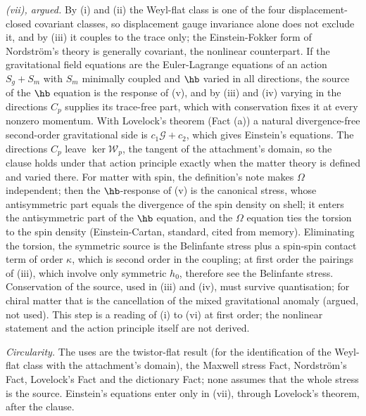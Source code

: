 \emph{(vii), argued.} By (i) and (ii) the Weyl-flat class is one of the four displacement-closed covariant classes, so displacement gauge invariance alone does not exclude it, and by (iii) it couples to the trace only; the Einstein-Fokker form of Nordstr\"om's theory is generally covariant, the nonlinear counterpart. If the gravitational field equations are the Euler-Lagrange equations of an action $S_{g} + S_{m}$ with $S_{m}$ minimally coupled and $\hb$ varied in all directions, the source of the $\hb$ equation is the response of (v), and by (iii) and (iv) varying in the directions $C_{p}$ supplies its trace-free part, which with conservation fixes it at every nonzero momentum. With Lovelock's theorem (Fact (a)) a natural divergence-free second-order gravitational side is $c_{1}\mathcal{G} + c_{2}$, which gives Einstein's equations. The directions $C_{p}$ leave $\ker\mathcal{W}_{p}$, the tangent of the attachment's domain, so the clause holds under that action principle exactly when the matter theory is defined and varied there. For matter with spin, the definition's note makes $\Omega$ independent; then the $\hb$-response of (v) is the canonical stress, whose antisymmetric part equals the divergence of the spin density on shell; it enters the antisymmetric part of the $\hb$ equation, and the $\Omega$ equation ties the torsion to the spin density (Einstein-Cartan, standard, cited from memory). Eliminating the torsion, the symmetric source is the Belinfante stress plus a spin-spin contact term of order $\kappa$, which is second order in the coupling; at first order the pairings of (iii), which involve only symmetric $h_{0}$, therefore see the Belinfante stress. Conservation of the source, used in (iii) and (iv), must survive quantisation; for chiral matter that is the cancellation of the mixed gravitational anomaly (argued, not used). This step is a reading of (i) to (vi) at first order; the nonlinear statement and the action principle itself are not derived.

\emph{Circularity.} The uses are the twistor-flat result (for the identification of the Weyl-flat class with the attachment's domain), the Maxwell stress Fact, Nordstr\"om's Fact, Lovelock's Fact and the dictionary Fact; none assumes that the whole stress is the source. Einstein's equations enter only in (vii), through Lovelock's theorem, after the clause.
